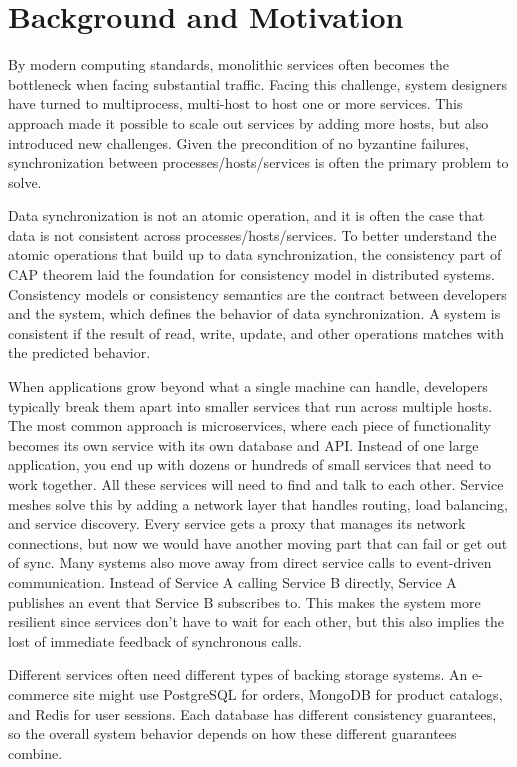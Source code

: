 \section{Background and Motivation}

By modern computing standards, monolithic services often becomes the
bottleneck when facing substantial traffic.
Facing this challenge, system designers have turned to multiprocess,
multi-host to host one or more services.
This approach made it possible to scale out services by adding more
hosts, but also introduced new challenges.
Given the precondition of no byzantine failures, synchronization
between processes/hosts/services is often the primary problem to solve.

Data synchronization is not an atomic operation, and it is often the
case that data is not consistent across processes/hosts/services.
To better understand the atomic operations that build up to data
synchronization, the consistency part of CAP theorem \cite{brewer2000towards}
laid the foundation for consistency model in distributed systems.
Consistency models or consistency semantics are the contract between
developers and the system, which defines the behavior of data
synchronization. A system is consistent if
the result of read, write, update, and other operations matches with
the predicted behavior.


When applications grow beyond what a single machine can handle, developers
typically break them apart into smaller services that run across multiple
hosts. The most common approach is microservices, where each piece of
functionality becomes its own service with its own database and API.
Instead of one large application, you end up with dozens or hundreds of
small services that need to work together. All these services will
need to find and talk to each other. Service meshes solve this by
adding a network layer
that handles routing, load balancing, and service discovery. Every service
gets a proxy that manages its network connections, but now we would have another
moving part that can fail or get out of sync. Many systems also move
away from direct service calls to event-driven
communication. Instead of Service A calling Service B directly, Service A
publishes an event that Service B subscribes to. This makes the system
more resilient since services don't have to wait for each other, but this
also implies the lost of immediate feedback of synchronous calls.

Different services often need different types of backing storage systems.
An e-commerce site might use PostgreSQL for orders, MongoDB for
product catalogs, and Redis for user sessions.
Each database has different consistency guarantees, so the overall
system behavior depends on how these different guarantees combine.

